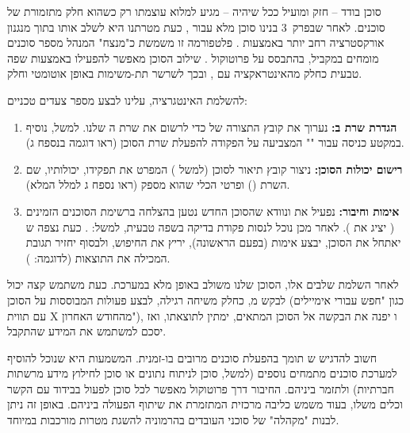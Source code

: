 
סוכן בודד – חזק ומועיל ככל שיהיה – מגיע למלוא עוצמתו רק כשהוא חלק מתזמורת של סוכנים. לאחר שבפרק~\num{3} בנינו סוכן  מלא עבור , כעת מטרתנו היא לשלב אותו בתוך מנגנון אורקסטרציה רחב יותר באמצעות . פלטפורמה זו משמשת כ"מנצח" המנהל מספר סוכנים מומחים במקביל, בהתבסס על פרוטוקול . שילוב הסוכן מאפשר להפעילו באמצעות שפה טבעית כחלק מהאינטראקציה עם , ובכך לשרשר תת-משימות באופן אוטומטי וחלק.

להשלמת האינטגרציה, עלינו לבצע מספר צעדים טכניים:
\begin{enumerate}
  \item \textbf{הגדרת שרת ב:} נערוך את קובץ התצורה של  כדי לרשום את שרת ה שלנו. למשל, נוסיף במקטע  כניסה עבור "" המצביעה על הפקודה להפעלת שרת הסוכן (ראו דוגמה בנספח ג).
  \item \textbf{רישום יכולות הסוכן:} ניצור קובץ תיאור לסוכן (למשל ) המפרט את תפקידו, יכולותיו, שם השרת () ופרטי הכלי שהוא מספק (ראו נספח ג למלל המלא).
  \item \textbf{אימות וחיבור:} נפעיל את  ונוודא שהסוכן החדש נטען בהצלחה ברשימת הסוכנים הזמינים ( יציג את ). לאחר מכן נוכל לנסות פקודת בדיקה בשפה טבעית, למשל: . כעת נצפה ש יאתחל את הסוכן, יבצע אימות  (בפעם הראשונה), יריץ את החיפוש, ולבסוף יחזיר תגובת  המכילה את התוצאות (לדוגמה: ).
\end{enumerate}

לאחר השלמת שלבים אלו, הסוכן שלנו משולב באופן מלא במערכת. כעת משתמש קצה יכול לבקש מ, כחלק משיחה רגילה, לבצע פעולות המבוססות על הסוכן (כגון "חפש עבורי אימיילים עם תווית X מהחודש האחרון"), ו יפנה את הבקשה אל הסוכן המתאים, ימתין לתוצאתו, ואז יסכם למשתמש את המידע שהתקבל.

חשוב להדגיש ש תומך בהפעלת סוכנים מרובים בו-זמנית. המשמעות היא שנוכל להוסיף למערכת סוכנים מתמחים נוספים (למשל, סוכן לניתוח נתונים או סוכן לחילוץ מידע מרשתות חברתיות) ולתזמר ביניהם. החיבור דרך פרוטוקול  מאפשר לכל סוכן לפעול בבידוד עם הקשר וכלים משלו, בעוד  משמש כליבה מרכזית המתזמרת את שיתוף הפעולה ביניהם\cite{Anthropic2025}. באופן זה ניתן לבנות "מקהלה" של סוכני  העובדים בהרמוניה להשגת מטרות מורכבות במיוחד.

